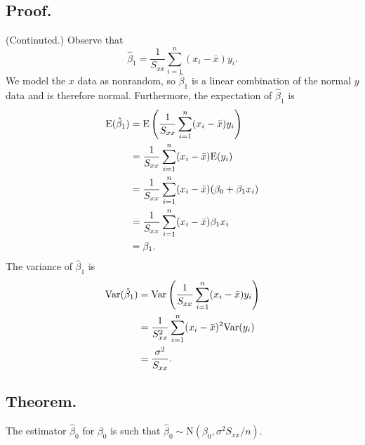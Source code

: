 \documentclass[titlepage]{article}
\begin{document}
\subsection{Proof.} (Continuted.) Observe that 
$$\hat{\beta}_{1} = \frac{1}{S_{xx}}\sum_{i=1}^{n}(x_{i} - \bar{x})y_{i}.$$
We model the $x$ data as nonrandom, so $\hat{\beta}_{1}$ is a linear combination of the normal $y$ data and is therefore normal. Furthermore, the expectation of $\hat{\beta}_{1}$ is
\begin{align*}
    \text{E}(\hat{\beta}_{1}) &= \text{E}\left(\frac{1}{S_{xx}}\sum_{i=1}^{n}(x_{i}-\bar{x})y_{i}\right) \\
                        &= \frac{1}{S_{xx}}\sum_{i=1}^{n}(x_{i}-\bar{x})\text{E}(y_{i}) \\
                        &= \frac{1}{S_{xx}}\sum_{i=1}^{n}(x_{i}-\bar{x})(\beta_{0} + \beta_{1}x_{i}) \\
                        &= \frac{1}{S_{xx}}\sum_{i=1}^{n}(x_{i}-\bar{x})\beta_{1}x_{i} \\
                        &= \beta_{1}.
\end{align*}
The variance of $\hat{\beta}_{1}$ is
\begin{align*}
    \text{Var}(\hat{\beta}_{1}) &= \text{Var}\left(\frac{1}{S_{xx}}\sum_{i=1}^{n}(x_{i}-\bar{x})y_{i}\right) \\
                          &= \frac{1}{S_{xx}^{2}}\sum_{i=1}^{n}(x_{i}-\bar{x})^{2}\text{Var}(y_{i}) \\
                          &= \frac{\sigma^{2}}{S_{xx}}.
\end{align*}

\subsection{Theorem.} The estimator $\hat{\beta}_{0}$ for $\beta_{0}$ is such that $\hat{\beta}_{0} \sim \text{N}(\beta_{0}, \sigma^{2}S_{xx}/n)$.
\end{document}
